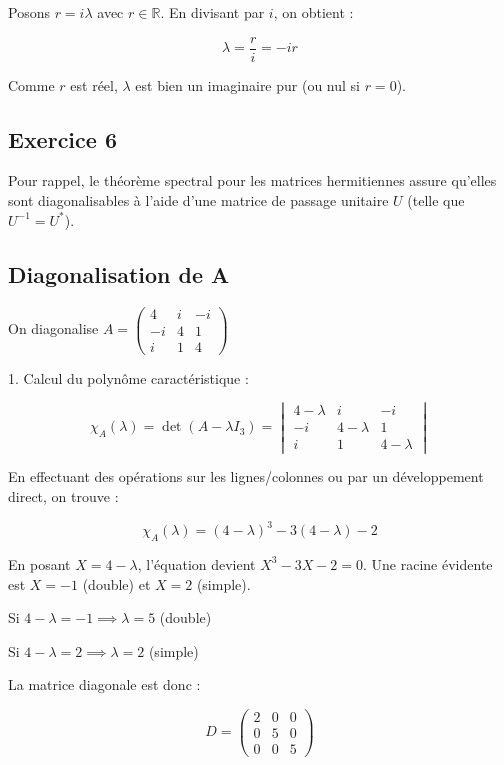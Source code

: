 \documentclass[french]{yLectureNote}
\begin{document}
Posons $r = i\lambda$ avec $r \in \mathbb{R}$. En divisant par $i$, on obtient :


$$\lambda = \frac{r}{i} = -ir$$

Comme $r$ est réel, $\lambda$ est bien un imaginaire pur (ou nul si $r=0$).

\subsection{Exercice 6}

Pour rappel, le théorème spectral pour les matrices hermitiennes assure qu'elles sont diagonalisables à l'aide d'une matrice de passage unitaire $U$ (telle que $U^{-1} = U^*$).

\subsection{Diagonalisation de A}
On diagonalise $A = \begin{pmatrix} 4 & i & -i \\ -i & 4 & 1 \\ i & 1 & 4 \end{pmatrix}$

1. Calcul du polynôme caractéristique :

$$\chi_A(\lambda) = \det(A - \lambda I_3) = \begin{vmatrix} 4-\lambda & i & -i \\ -i & 4-\lambda & 1 \\ i & 1 & 4-\lambda \end{vmatrix}$$



En effectuant des opérations sur les lignes/colonnes ou par un développement direct, on trouve :

$$\chi_A(\lambda) = (4-\lambda)^3 - 3(4-\lambda) - 2$$



En posant $X = 4-\lambda$, l'équation devient $X^3 - 3X - 2 = 0$. Une racine évidente est $X = -1$ (double) et $X = 2$ (simple).

Si $4-\lambda = -1 \implies \lambda = 5$ (double)

 Si $4-\lambda = 2 \implies \lambda = 2$ (simple)


La matrice diagonale est donc :

$$D = \begin{pmatrix} 2 & 0 & 0 \\ 0 & 5 & 0 \\ 0 & 0 & 5 \end{pmatrix}$$
\end{document}
